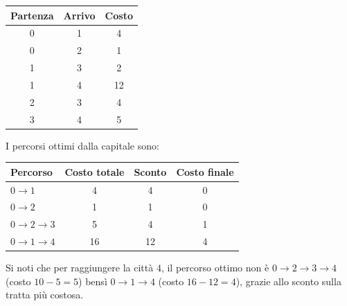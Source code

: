 \begin{center}
\begin{tabular}{|c|c|c|}
\hline
\textbf{Partenza} & \textbf{Arrivo} & \textbf{Costo} \\
\hline
0 & 1 & 4  \\
0 & 2 & 1  \\
1 & 3 & 2  \\
1 & 4 & 12 \\
2 & 3 & 4  \\
3 & 4 & 5  \\
\hline
\end{tabular}
\end{center}

I percorsi ottimi dalla capitale sono:

\begin{center}
\begin{tabular}{|l|c|c|c|}
\hline
\textbf{Percorso} & \textbf{Costo totale} & \textbf{Sconto} & \textbf{Costo finale} \\
\hline
$0 \to 1$         & 4  & 4  & 0 \\
$0 \to 2$         & 1  & 1  & 0 \\
$0 \to 2 \to 3$   & 5  & 4  & 1 \\
$0 \to 1 \to 4$   & 16 & 12 & 4 \\
\hline
\end{tabular}
\end{center}

Si noti che per raggiungere la città $4$, il percorso ottimo non è 
$0 \to 2 \to 3 \to 4$ (costo $10 - 5 = 5$) bensì $0 \to 1 \to 4$ 
(costo $16 - 12 = 4$), grazie allo sconto sulla tratta più costosa.